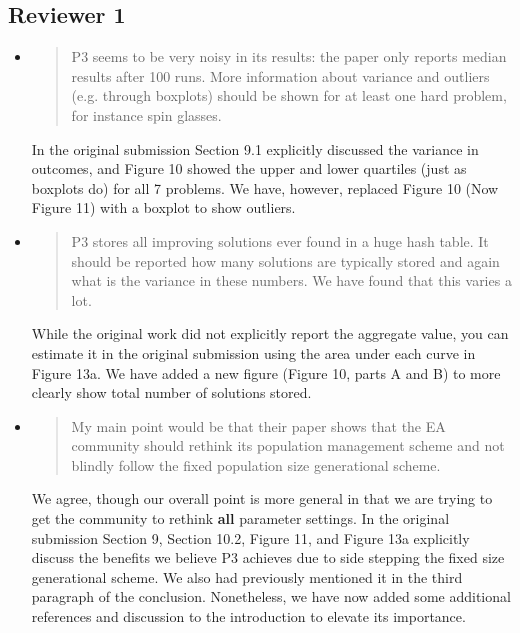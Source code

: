 \documentclass[]{article}
\begin{document}
\subsection{Reviewer 1}
\begin{itemize}

\item
\begin{quote}
P3 seems to be very noisy in its results: the paper only reports median results after 100 runs. More information about variance and outliers (e.g. through boxplots) should be shown for at least one hard problem, for instance spin glasses. 
\end{quote}

In the original submission Section 9.1 explicitly discussed the variance in outcomes,
and Figure 10 showed the upper and lower quartiles (just as boxplots do) for all 7 problems.
We have, however, replaced Figure 10 (Now Figure 11) with a boxplot to show outliers.

\item
\begin{quote}
P3 stores all improving solutions ever found in a huge hash table. It should be reported how many solutions are typically stored and again what is the variance in these numbers. We have found that this varies a lot. 
\end{quote}

While the original work did not explicitly report the aggregate value,
you can estimate it in the original submission using the area under each curve in Figure 13a.
We have added a new figure (Figure 10, parts A and B) to more clearly show total number of solutions stored.

\item
\begin{quote}
My main point would be that their paper shows that the EA community should rethink its population management scheme and not blindly follow the fixed population size generational scheme.
\end{quote}

We agree, though our overall point is more general in that we are trying to get the community to rethink
\textbf{all} parameter settings. In the original submission Section 9, Section 10.2,
Figure 11, and Figure 13a explicitly discuss the benefits we believe P3 achieves due
to side stepping the fixed size generational scheme.
We also had previously mentioned it in the third paragraph of the conclusion.
Nonetheless, we have now added some additional references and discussion to the introduction to elevate its importance.


\end{itemize}
\end{document}
